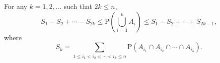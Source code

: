 For any $k = 1, 2, \ldots$ such that $2k \leq n$,
$$S_1 - S_2 + \cdots - S_{2k} \leq \text{P}\left(\bigcup_{i=1}^{n} A_i\right) \leq S_1 - S_2 + \cdots + S_{2k-1},$$
where
$$S_k = \sum_{1 \leq i_1 < i_2 < \cdots < i_k \leq n} \text{P}(A_{i_1} \cap A_{i_2} \cap \cdots \cap A_{i_k}).$$
